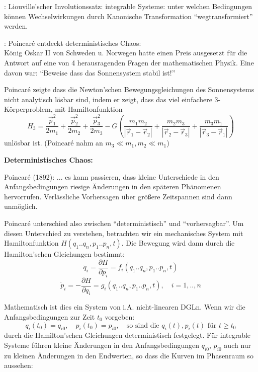 \documentclass[10pt, letterpaper]{article}
\begin{document}
: Liouville'scher Involutionssatz: integrable Systeme: unter welchen Bedingungen können Wechselwirkungen durch Kanonische Transformation ``wegtransformiert'' werden.

: Poincaré entdeckt deterministisches Chaos:\\
König Oskar II von Schweden u. Norwegen hatte einen Preis ausgesetzt für die Antwort auf eine von 4 herausragenden Fragen der mathematischen Physik. Eine davon war:
\noindent
``Beweise dass das Sonnensystem stabil ist!''

\noindent
Poincaré zeigte dass die Newton'schen Bewegungsgleichungen des Sonnensystems nicht analytisch lösbar sind, indem er zeigt, dass das viel einfachere 3-Körperproblem, mit Hamiltonfunktion
\[
H_3 = \frac{\vec{p}_1^2}{2m_1} + \frac{\vec{p}_2^2}{2m_2} + \frac{\vec{p}_3^2}{2m_3} - G\left(\frac{m_1m_2}{|\vec{r}_1-\vec{r}_2|} + \frac{m_2m_3}{|\vec{r}_2-\vec{r}_3|} + \frac{m_3m_1}{|\vec{r}_3-\vec{r}_1|}\right)
\]
unlösbar ist. (Poincaré nahm an $m_3 \ll m_1, m_2 \ll m_1$)

\noindent


\textbf{Deterministisches Chaos:}

\noindent
Poincaré (1892): ... es kann passieren, dass kleine Unterschiede in den Anfangsbedingungen riesige Änderungen in den späteren Phänomenen hervorrufen. Verlässliche Vorhersagen über größere Zeitspannen sind dann unmöglich.

\noindent
Poincaré unterschied also zwischen ``deterministisch'' und ``vorhersagbar''. Um diesen Unterschied zu verstehen, betrachten wir ein mechanisches System mit Hamiltonfunktion $H(q_1..q_n,p_1..p_n,t)$. Die Bewegung wird dann durch die Hamilton'schen Gleichungen bestimmt:
\[
\dot{q}_i = \frac{\partial H}{\partial p_i} = f_i(q_1..q_n,p_1..p_n,t)
\]
\[
\dot{p}_i = -\frac{\partial H}{\partial q_i} = g_i(q_1..q_n,p_1..p_n,t), \quad i=1,..,n
\]

\noindent
Mathematisch ist dies ein System von i.A. nicht-linearen DGLn. Wenn wir die Anfangsbedingungen zur Zeit $t_0$ vorgeben:
\[
q_i(t_0) = q_{i0}, \quad p_i(t_0) = p_{i0}, \quad \text{so sind die } q_i(t), p_i(t) \text{ für } t \geq t_0
\]
durch die Hamilton'schen Gleichungen deterministisch festgelegt.
\noindent
Für integrable Systeme führen kleine Änderungen in den Anfangsbedingungen $q_{i0}$, $p_{i0}$ auch nur zu kleinen Änderungen in den Endwerten, so dass die Kurven im Phasenraum so aussehen:
\end{document}
